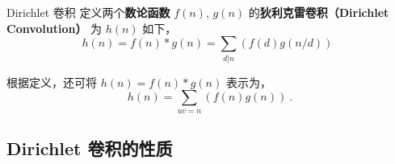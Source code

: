 
\begin{definition}{Dirichlet 卷积}
定义两个\textbf{数论函数} $f(n)$, $g(n)$ 的\textbf{狄利克雷卷积（Dirichlet Convolution）} 为 $h(n)$ 如下，
\begin{equation}
h(n) = f(n) * g(n) = \sum_{d|n}\left(f(d) g(n/d)\right) ~~
\end{equation}
\end{definition}
根据定义，还可将 $h(n) = f(n) * g(n)$ 表示为，
\begin{equation}
h(n) = \sum_{uv = n} (f(n) g(n)) ~.
\end{equation}

\subsection{Dirichlet 卷积的性质}
